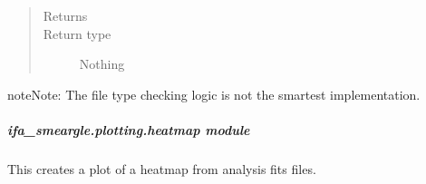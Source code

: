 \documentclass[letterpaper,10pt,english]{sphinxmanual}
\begin{document}
\begin{fulllineitems}
\begin{quote}
\begin{description}
\begin{itemize}
\end{itemize}

\item[{Returns}] \leavevmode


\item[{Return type}] \leavevmode
Nothing

\end{description}\end{quote}

\begin{sphinxadmonition}{note}{Note:}
The file type checking logic is not the smartest implementation.
\end{sphinxadmonition}

\end{fulllineitems}



\subparagraph{ifa\_smeargle.plotting.heatmap module}
\label{\detokenize{docstrings/ifa_smeargle.plotting.heatmap:module-ifa_smeargle.plotting.heatmap}}\label{\detokenize{docstrings/ifa_smeargle.plotting.heatmap:ifa-smeargle-plotting-heatmap-module}}\label{\detokenize{docstrings/ifa_smeargle.plotting.heatmap::doc}}
This creates a plot of a heat\sphinxhyphen{}map from analysis fits files.
\end{document}
